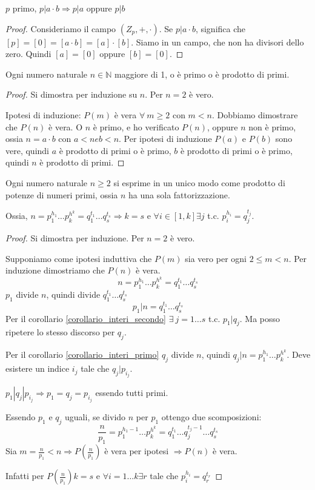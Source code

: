 \begin{cor}\label{corollario_interi_secondo}
$p$ primo, $p | a \cdot b \Rightarrow p | a$ oppure $p | b$
\end{cor}
\begin{proof}
Consideriamo il campo $(Z_p, +, \cdot)$. Se $p | a \cdot b$, significa che $[p] = [0] = [a \cdot b] = [a] \cdot [b]$. Siamo in un campo, che non ha divisori dello zero. Quindi $[a] = [0]$ oppure $[b] = [0]$.
\end{proof}

\begin{prop}
Ogni numero naturale $n \in \mathbb{N}$ maggiore di 1, o \`e primo o \`e prodotto di primi.
\end{prop}
\begin{proof}
Si dimostra per induzione su $n$. Per $n = 2$ \`e vero.

Ipotesi di induzione: $P(m)$ \`e vera $\forall \ m \ge 2$ con $m < n$. Dobbiamo dimostrare che $P(n)$ \`e vera. O $n$ \`e primo, e ho verificato $P(n)$, oppure $n$ non \`e primo, ossia $n = a \cdot b$ con $a < n e b < n$. Per ipotesi di induzione $P(a)$ e $P(b)$ sono vere, quindi $a$ \`e prodotto di primi o \`e primo, $b$ \`e prodotto di primi o \`e primo, quindi $n$ \`e prodotto di primi.
\end{proof}

\begin{theorem}
Ogni numero naturale $n \ge 2$ si esprime in un unico modo come prodotto di potenze di numeri primi, ossia $n$ ha una sola fattorizzazione.

Ossia, $n = p_{1}^{h_1} \dots p_{k}^{h^k} = q_{1}^{t_1} \dots q_{s}^{t_s} \Rightarrow k = s$ e $\forall i \in [1, k] \exists j$ t.c. $p_i^{h_i} = q_j^{t_j}$.
\end{theorem}
\begin{proof}
Si dimostra per induzione. Per $n = 2$ \`e vero.

Supponiamo come ipotesi induttiva che $P(m)$ sia vero per ogni $2 \le m < n$. Per induzione dimostriamo che $P(n)$ \`e vera.
\[
n = p_{1}^{h_1} \dots p_{k}^{h^k} = q_{1}^{t_1} \dots q_{s}^{t_s}
\]
$p_1$ divide $n$, quindi divide $q_{1}^{t_1} \dots q_{s}^{t_s}$
\[
p_1 | n = q_{1}^{t_1} \dots q_{s}^{t_s}
\]
Per il corollario \ref{corollario_interi_secondo} $\exists \ j = 1 \dots s$ t.c. $p_1 | q_j$. Ma posso ripetere lo stesso discorso per $q_j$.

Per il corollario \ref{corollario_interi_primo} $q_j$ divide $n$, quindi $q_j | n = p_{1}^{h_1} \dots p_{k}^{h^k}$. Deve esistere un indice $i_j$ tale che $q_j | p_{i_j}$.

$p_1 | q_j | p_{i_j} \Rightarrow p_1 = q_j = p_{i_j}$ essendo tutti primi.

Essendo $p_1$ e $q_j$ uguali, se divido $n$ per $p_1$ ottengo due scomposizioni:
\[
\frac{n}{p_1} = p_{1}^{h_1 - 1} \dots p_{k}^{h^k} = q_{1}^{t_1} \dots q_{j}^{t_j - 1}\dots q_{s}^{t_s}
\]
Sia $m = \frac{n}{p_1} < n \Rightarrow P(\frac{n}{p_1})$ \`e vera per ipotesi $\Rightarrow P(n)$ \`e vera.

Infatti per $P( \frac{n}{p_1}) k = s$ e $\forall i = 1 \dots k \exists r$ tale che $p_i^{h_i} = q_r^{t_r}$
\end{proof}

